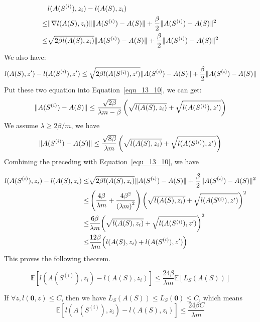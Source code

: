 \begin{equation}
	\label{equ_13_10}
	\begin{aligned}
		& l( A(S^{(i)}), z_i) - l( A(S), z_i) \\
		\le & \Arrowvert \nabla l ( A(S), z_i) \Arrowvert \Arrowvert A(S^{(i)}) - A(S) \Arrowvert
		+ \frac{\beta}{2} \Arrowvert A(S^{(i)}) - A(S) \Arrowvert^2 \\
		\le & \sqrt{2\beta l(A(S), z_i)} \Arrowvert A(S^{(i)}) - A(S) \Arrowvert
		+ \frac{\beta}{2} \Arrowvert A(S^{(i)}) - A(S) \Arrowvert^2
	\end{aligned}
\end{equation}
We also have:
\begin{equation}
	l( A(S), z') - l( A(S^{(i)}), z')
	\le \sqrt{2\beta l( A( S^{(i)} ), z')}	\Arrowvert A(S^{(i)}) - A(S) \Arrowvert
	+\frac{\beta}{2} \Arrowvert A(S^{(i)}) - A(S) \Arrowvert
\end{equation}
Put these two equation into Equation~\ref{equ_13_10}, we can get:
\[ 
	\Arrowvert A(S^{(i)}) - A(S) \Arrowvert \le
	\frac{\sqrt{2\beta}}{\lambda m - \beta}
	\left( \sqrt{l(A(S), z_i)} + \sqrt{l(A(S^{(i)}), z')}\right)
\]
We assume $ \lambda \ge 2\beta/m $, we have
\[ 
	\Arrowvert A(S^{(i)}) - A(S) \Arrowvert \le
	\frac{\sqrt{8\beta}}{\lambda m}
	\left( \sqrt{l(A(S), z_i)} + \sqrt{l(A(S^{(i)}), z')}\right)
\]
Combining the preceding with Equation~\ref{equ_13_10}, we have

\begin{equation}
	\begin{aligned}
		l(A(S^{(i)}), z_i) - l(A(S), z_i)
		\le & \sqrt{2\beta l(A(S), z_i)} \Arrowvert A(S^{(i)}) - A(S) \Arrowvert 
		+ \frac{\beta}{2} \Arrowvert A(S^{(i)}) - A(S) \Arrowvert^2 \\
		\le & \left( \frac{4\beta}{\lambda m} + \frac{4\beta^2}{{(\lambda m)}^2} \right)
		{\left( \sqrt{l(A(S), z_i)} + \sqrt{l(A(S^{(i)}), z')} \right)}^2 \\
		\le & \frac{6\beta}{\lambda m}
		{\left( \sqrt{l(A(S), z_i)} + \sqrt{l(A(S^{(i)}), z')} \right)}^2 \\
		\le & \frac{12\beta}{\lambda m}
		{\left( {l(A(S), z_i)} + {l(A(S^{(i)}), z')} \right)}
	\end{aligned}
\end{equation}
This proves the following theorem.
\begin{thm}
	\begin{equation}
		\mathbb{E} [l(A(S^{(i)}), z_i) - l(A(S), z_i)] \le
		\frac{24\beta}{\lambda m} \mathbb{E}[L_S(A(S))]
	\end{equation}
\end{thm}
If $\forall z, l(\mathbf{0}, z) \le C $, then we have
$ L_S(A(S)) \le  L_S(\mathbf{0}) \le C $, which means
\[ 
	\mathbb{E} [l(A(S^{(i)}), z_i) - l(A(S), z_i)] \le \frac{24\beta C}{\lambda m}
\]

